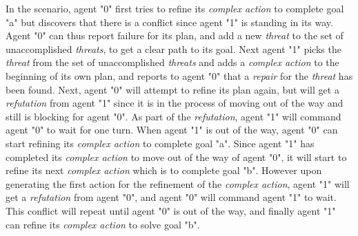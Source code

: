 \documentclass[Main]{subfiles}
\begin{document}
In the scenario, agent "0" first tries to refine its \textit{complex action} to complete goal "a" but discovers that there is a conflict since agent "1" is standing in its way.
Agent "0" can thus report failure for its plan, and add a new \textit{threat} to the set of unaccomplished \textit{threats}, to get a clear path to its goal.
Next agent "1" picks the \textit{threat} from the set of unaccomplished \textit{threats} and adds a \textit{complex action} to the beginning of its own plan, and reports to agent "0" that a \textit{repair} for the \textit{threat} has been found.
Next, agent "0" will attempt to refine its plan again, but will get a \textit{refutation} from agent "1" since it is in the process of moving out of the way and still is blocking for agent "0".
As part of the \textit{refutation}, agent "1" will command agent "0" to wait for one turn.
When agent "1" is out of the way, agent "0" can start refining its \textit{complex action} to complete goal "a".
Since agent "1" has completed its \textit{complex action} to move out of the way of agent "0", it will start to refine its next \textit{complex action} which is to complete goal "b".
However upon generating the first action for the refinement of the \textit{complex action}, agent "1" will get a \textit{refutation} from agent "0", and agent "0" will command agent "1" to wait.
This conflict will repeat until agent "0" is out of the way, and finally agent "1" can refine its \textit{complex action} to solve goal "b".






\end{document}
